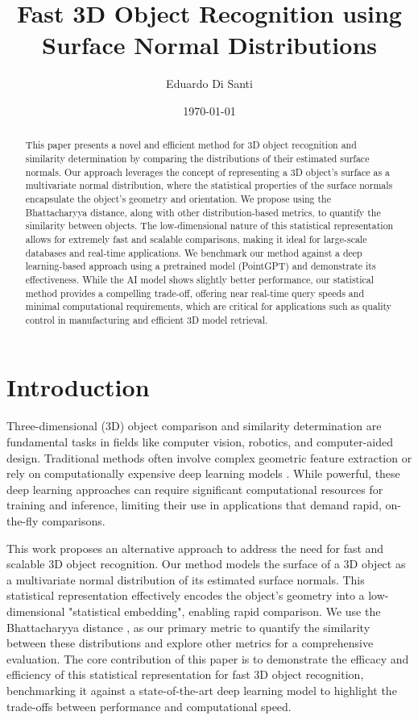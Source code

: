 \documentclass{article}
\title{Fast 3D Object Recognition using Surface Normal Distributions}
\author{
  Eduardo Di Santi
}
\date{\today}
\begin{document}
\maketitle

\begin{abstract}
    This paper presents a novel and efficient method for 3D object recognition and similarity determination by comparing the distributions of their estimated surface normals. Our approach leverages the concept of representing a 3D object's surface as a multivariate normal distribution, where the statistical properties of the surface normals encapsulate the object's geometry and orientation. We propose using the Bhattacharyya distance, along with other distribution-based metrics, to quantify the similarity between objects. The low-dimensional nature of this statistical representation allows for extremely fast and scalable comparisons, making it ideal for large-scale databases and real-time applications. We benchmark our method against a deep learning-based approach using a pretrained model (PointGPT) and demonstrate its effectiveness. While the AI model shows slightly better performance, our statistical method provides a compelling trade-off, offering near real-time query speeds and minimal computational requirements, which are critical for applications such as quality control in manufacturing and efficient 3D model retrieval.
\end{abstract}

\setlength{\parindent}{20pt}

\section{Introduction}
Three-dimensional (3D) object comparison and similarity determination are fundamental tasks in fields like computer vision, robotics, and computer-aided design. Traditional methods often involve complex geometric feature extraction or rely on computationally expensive deep learning models \cite{relevant_deep_learning_survey}. While powerful, these deep learning approaches can require significant computational resources for training and inference, limiting their use in applications that demand rapid, on-the-fly comparisons.

This work proposes an alternative approach to address the need for fast and scalable 3D object recognition. Our method models the surface of a 3D object as a multivariate normal distribution of its estimated surface normals. This statistical representation effectively encodes the object's geometry into a low-dimensional "statistical embedding", enabling rapid comparison. We use the Bhattacharyya distance \cite{Bhattacharyya}, as our primary metric to quantify the similarity between these distributions and explore other metrics for a comprehensive evaluation. The core contribution of this paper is to demonstrate the efficacy and efficiency of this statistical representation for fast 3D object recognition, benchmarking it against a state-of-the-art deep learning model to highlight the trade-offs between performance and computational speed.
\end{document}
